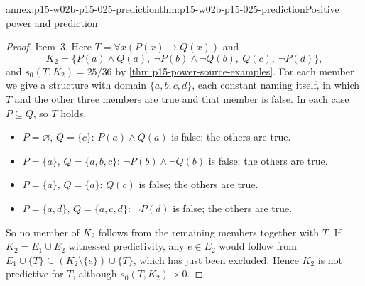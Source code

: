 \begin{annexitem}{annex:p15-w02b-p15-025-prediction}{thm:p15-w02b-p15-025-prediction}{Positive power and prediction}
\begin{proof}
Item~3. Here \(T=\forall x(P(x)\to Q(x))\) and
\[
 K_2=\{P(a)\wedge Q(a),\ \neg P(b)\wedge\neg Q(b),\ Q(c),\ \neg P(d)\},
\]
and \(s_0(T,K_2)=25/36\) by \cref{thm:p15-power-source-examples}. For
each member we give a structure with domain \(\{a,b,c,d\}\), each
constant naming itself, in which \(T\) and the other three members are
true and that member is false. In each case \(P\subseteq Q\), so \(T\)
holds.
\begin{itemize}
\item \(P=\varnothing\), \(Q=\{c\}\): \(P(a)\wedge Q(a)\) is false;
the others are true.
\item \(P=\{a\}\), \(Q=\{a,b,c\}\): \(\neg P(b)\wedge\neg Q(b)\) is
false; the others are true.
\item \(P=\{a\}\), \(Q=\{a\}\): \(Q(c)\) is false; the others are true.
\item \(P=\{a,d\}\), \(Q=\{a,c,d\}\): \(\neg P(d)\) is false; the others
are true.
\end{itemize}
So no member of \(K_2\) follows from the remaining members together with
\(T\). If \(K_2=E_1\mathbin{\dot\cup}E_2\) witnessed predictivity, any
\(e\in E_2\) would follow from \(E_1\cup\{T\}\subseteq
(K_2\setminus\{e\})\cup\{T\}\), which has just been excluded. Hence
\(K_2\) is not predictive for \(T\), although \(s_0(T,K_2)>0\).
\end{proof}
\end{annexitem}

